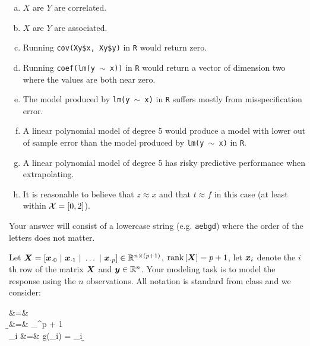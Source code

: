 \documentclass[12pt,landscape]{article}
\newcommand{\instr}{\small Your answer will consist of a lowercase string (e.g. \texttt{aebgd}) where the order of the letters does not matter. \normalsize}
\begin{document}
\begin{enumerate}[(a)]
\item $X$ are $Y$ are correlated.
\item $X$ are $Y$ are associated.
\item Running \texttt{cov(Xy\$x, Xy\$y)} in \texttt{R} would return zero.
\item Running \texttt{coef(lm(y $\sim$ x))} in \texttt{R} would return a vector of dimension two where the values are both near zero.
\item The model produced by \texttt{lm(y $\sim$ x)} in \texttt{R} suffers mostly from misspecification error.
\item A linear polynomial model of degree 5 would produce a model with lower out of sample error than the model produced by \texttt{lm(y $\sim$ x)} in \texttt{R}.
\item A linear polynomial model of degree 5 has risky predictive performance when extrapolating.
\item It is reasonable to believe that $z \approx x$ and that $t \approx f$ in this case (at least within $\mathcal{X} = \left[0,2\right]$).
\end{enumerate}
\eenum\instr\pagebreak


\problem{} Let $\boldsymbol{X} = \left[\boldsymbol{x}_{\cdot 0}~|~\boldsymbol{x}_{\cdot 1}~|~\ldots~|~\boldsymbol{x}_{\cdot p}\right] \in \mathbb{R}^{n \times (p +1)}$, $\text{rank}\left[\boldsymbol{X}\right] = p + 1$, let $\boldsymbol{x}_i$ denote the $i$th row of the matrix $\boldsymbol{X}$ and $\boldsymbol{y} \in \mathbb{R}^n$. Your modeling task is to model the response using the $n$ observations. All notation is standard from class and we consider:

\beqn
 &=&  \\
\b &=& \displaystyle\argmin_{\w \in \reals^{p + 1}}\braces{(\y - \X\w)^\top (\y - \X\w)} \\
_i &=& g(\x_i) = \x_i \b
\eeqn

\benum{}
\end{document}
